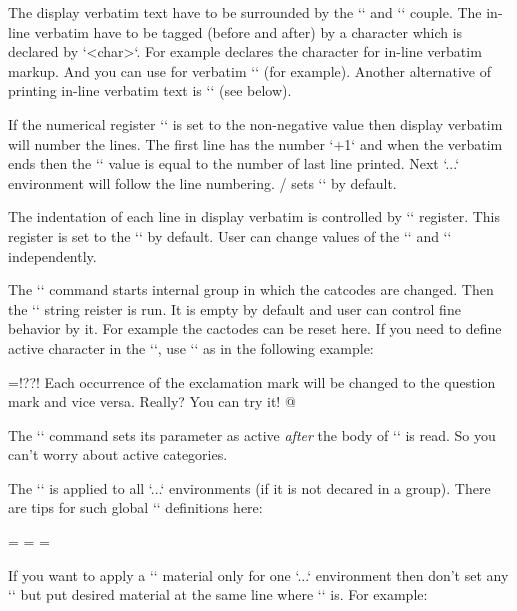 The display verbatim text have to be surrounded by the `\begtt` and
`\endtt` couple. 
The in-line verbatim have to be tagged (before and after) 
by a character which is declared by
`\activettchar<char>`. For example  
declares the character  
for in-line verbatim markup. 
And you can use  for
verbatim `\relax` (for example).
\new
Another alternative of printing in-line
verbatim text is `` (see below). 

If the numerical register `\ttline` is set to the non-negative value then
display verbatim will number the lines. The first line has the number
`\ttline+1` and when the verbatim ends then the `\ttline` value is equal to the
number of last line printed. Next `\begtt...\endtt` environment will follow
the line numbering. \OpTeX/ sets `` by default.

The indentation of each line in display verbatim is controlled by
`\ttindent` register. This register is set to the `\parindent` by default.
User can change values of the `\parindent` and `\ttindent` independently.

The `\begtt` command starts internal group in which the catcodes are changed. 
\new
Then the `\tthook` string reister is run. It is empty by default and user can
control fine behavior by it. For example the cactodes can be reset here. If
you need to define active character in the `\tthook`, use `\adef` as in the
following example:

\begtt   \adef@{\string\endtt}
\tthook={\adef!{?}\adef?{!}}
\begtt
Each occurrence of the exclamation mark will be changed to 
the question mark and vice versa. Really? You can try it! 
@
\endtt

The `\adef` command sets its parameter as active {\it after\/}
the body of `\tthook` is read. So you can't worry about active
categories. 

The `\tthook` is applied to all `\begtt...\endtt` environments (if it is not
decared in a group). There are tips for such global `\tthook` definitions here:

\begtt
\tthook={\typosize[9/11]}      %
\tthook={}            %
\tthook={} %
\endtt

\new
If you want to apply a `\tthook` material only for one `\begtt...\endtt`
environment then don't set any `\tthook` but put desired material at the 
same line where `\begtt` is. For example:

